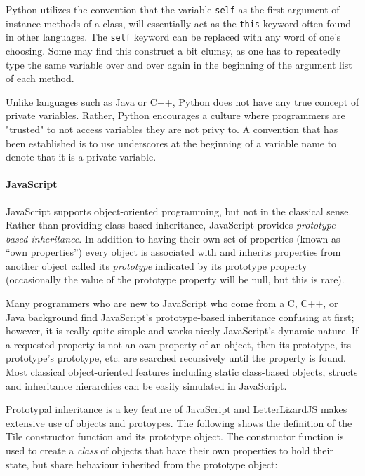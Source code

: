 Python utilizes the convention that the variable \texttt{self} as the first argument of instance methods of a class, will essentially act as the \texttt{this} keyword often found in other languages. The \texttt{self} keyword can be replaced with any word of one's choosing. Some may find this construct a bit clumsy, as one has to repeatedly type the same variable over and over again in the beginning of the argument list of each method.

Unlike languages such as Java or C++, Python does not have any true concept of private variables. Rather, Python encourages a culture where programmers are "trusted" to not access variables they are not privy to. A convention that has been established is to use underscores at the beginning of a variable name to denote that it is a private variable.

\paragraph{JavaScript}
JavaScript supports object-oriented programming, but not in the classical
sense. Rather than providing class-based inheritance, JavaScript provides
\emph{prototype-based inheritance}. In addition to having their own set of 
properties (known as ``own properties'') every object is associated with and
inherits properties from another object called its \emph{prototype}
indicated by its prototype property (occasionally the value of the prototype
property will be null, but this is rare). 

Many programmers who are new to JavaScript who come from a
C, C++, or Java background find JavaScript's prototype-based inheritance
confusing at first; however, it is really quite simple and works nicely
JavaScript's dynamic nature. If a requested property is not an own property
of an object, then its prototype, its prototype's prototype, etc. are searched
recursively until the property is found. Most classical object-oriented features
including static class-based objects, structs and inheritance hierarchies can be
easily simulated in JavaScript. 

Prototypal inheritance is a key feature of JavaScript and LetterLizardJS makes
extensive use of objects and protoypes. The following shows the definition
of the Tile constructor function and its prototype object. The constructor function
is used to create a \emph{class} of objects that have their own properties to
hold their state, but share behaviour inherited from the prototype object:

